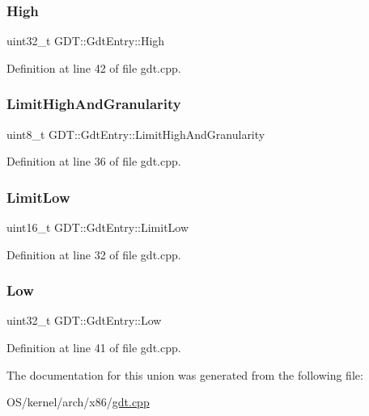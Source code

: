 \subsubsection{\texorpdfstring{High}{High}}
{\footnotesize\ttfamily uint32\+\_\+t G\+D\+T\+::\+Gdt\+Entry\+::\+High}



Definition at line 42 of file gdt.\+cpp.

\mbox{\label{union_g_d_t_1_1_gdt_entry_a6d6f4070f4f1f45de0a52cb0d3b85fd5}} 
\subsubsection{\texorpdfstring{Limit\+High\+And\+Granularity}{LimitHighAndGranularity}}
{\footnotesize\ttfamily uint8\+\_\+t G\+D\+T\+::\+Gdt\+Entry\+::\+Limit\+High\+And\+Granularity}



Definition at line 36 of file gdt.\+cpp.

\mbox{\label{union_g_d_t_1_1_gdt_entry_aa14653f9f38fbb5e60a917afb5f744fc}} 
\subsubsection{\texorpdfstring{Limit\+Low}{LimitLow}}
{\footnotesize\ttfamily uint16\+\_\+t G\+D\+T\+::\+Gdt\+Entry\+::\+Limit\+Low}



Definition at line 32 of file gdt.\+cpp.

\mbox{\label{union_g_d_t_1_1_gdt_entry_a92c8422ad96383d5c548f8e022a99278}} 
\subsubsection{\texorpdfstring{Low}{Low}}
{\footnotesize\ttfamily uint32\+\_\+t G\+D\+T\+::\+Gdt\+Entry\+::\+Low}



Definition at line 41 of file gdt.\+cpp.



The documentation for this union was generated from the following file\+:\begin{DoxyCompactItemize}
\item 
O\+S/kernel/arch/x86/\hyperlink{gdt_8cpp}{gdt.\+cpp}\end{DoxyCompactItemize}
